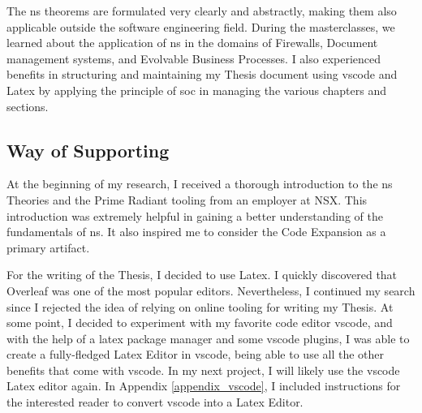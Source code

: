The \gls{ns} theorems are formulated very clearly and abstractly, making them also
applicable outside the software engineering field. During the masterclasses, we learned
about the application of \gls{ns} in the domains of Firewalls, Document management
systems, and Evolvable Business Processes. I also experienced benefits in structuring and
maintaining my Thesis document using \gls{vscode} and Latex by applying the principle of
\gls{soc} in managing the various chapters and sections. 

\subsection{Way of Supporting}

At the beginning of my research, I received a thorough introduction to the \gls{ns}
Theories and the Prime Radiant tooling from an employer at NSX. This introduction was
extremely helpful in gaining a better understanding of the fundamentals of \gls{ns}. It
also inspired me to consider the Code Expansion as a primary artifact. 

For the writing of the Thesis, I decided to use Latex. I quickly discovered that Overleaf
was one of the most popular editors. Nevertheless, I continued my search since I rejected
the idea of relying on online tooling for writing my Thesis. At some point, I decided to
experiment with my favorite code editor \gls{vscode}, and with the help of a latex package
manager and some \gls{vscode} plugins, I was able to create a fully-fledged Latex Editor
in \gls{vscode}, being able to use all the other benefits that come with \gls{vscode}. In
my next project, I will likely use the \gls{vscode} Latex editor again. In Appendix
\ref{appendix_vscode}, I included instructions for the interested reader to convert
\gls{vscode} into a Latex Editor.
